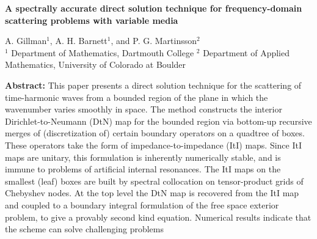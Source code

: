 \documentclass[11pt,final]{amsart}
\theoremstyle{definition}
\numberwithin{remark}{section}
\numberwithin{definition}{section}
\numberwithin{pro}{section}
\begin{document}
\begin{center}
\textbf{\large A spectrally accurate direct solution technique for
frequency-domain scattering problems with variable media}

\lsp

{\small A. Gillman$^1$,  A. H. Barnett$^1$, and P. G. Martinsson$^2$\\
$^1$ Department of Mathematics, Dartmouth College \quad $^2$ Department of Applied Mathematics, University of Colorado at Boulder}

\lsp

\begin{minipage}{135mm}
\noindent\textbf{Abstract:}
This paper presents a direct solution technique for the scattering of time-harmonic
waves from a bounded region of the plane in which the wavenumber varies
smoothly in space.
%
The method constructs the interior Dirichlet-to-Neumann (DtN) map
for the bounded region via
bottom-up recursive merges of (discretization of) certain boundary operators on a quadtree of boxes.
%
These operators take the form of impedance-to-impedance (ItI) maps.
%
Since ItI maps are unitary, this formulation is inherently numerically
stable, and is immune to problems of artificial internal resonances.
%
The ItI maps on the smallest (leaf) boxes are built by spectral collocation
on tensor-product grids of Chebyshev nodes.
%
%
At the top level the DtN map is recovered from the ItI map and coupled
to a boundary integral formulation of the free space exterior problem,
to give a provably second kind equation.
%
Numerical results indicate that the scheme can solve challenging problems

\end{minipage}
\end{center}
\end{document}
